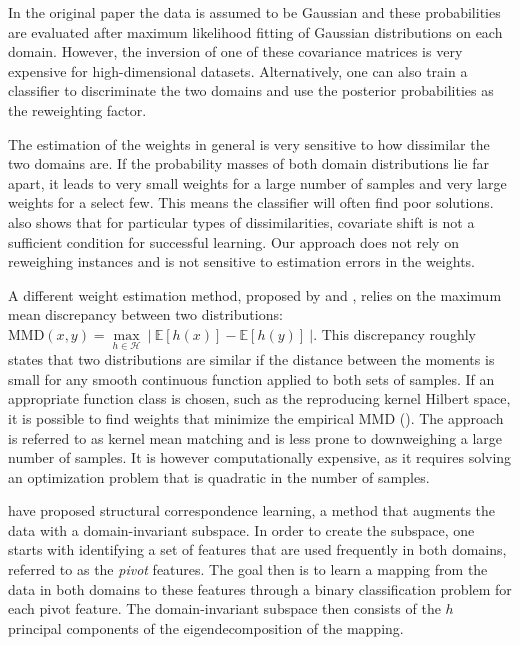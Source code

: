 \documentclass[twoside,11pt]{article}
\begin{document}
In the original paper the data is assumed to be Gaussian and these probabilities are evaluated after maximum likelihood fitting of Gaussian distributions on each domain. However, the inversion of one of these covariance matrices is very expensive for high-dimensional datasets. Alternatively, one can also train a classifier to discriminate the two domains and use the posterior probabilities as the reweighting factor. 

The estimation of the weights in general is very sensitive to how dissimilar the two domains are. If the probability masses of both domain distributions lie far apart, it leads to very small weights for a large number of samples and very large weights for a select few. This means the classifier will often find poor solutions. \cite{ben2010impossibility} also shows that for particular types of dissimilarities, covariate shift is not a sufficient condition for successful learning. Our approach does not rely on reweighing instances and is not sensitive to estimation errors in the weights.

A different weight estimation method, proposed by \cite{huang2007correcting} and \cite{gretton2009covariate}, relies on the maximum mean discrepancy between two distributions: $\text{MMD}(x,y) = \underset{h \in \mathcal{H}}{\max} \ | \ \mathbb{E}[h(x)] - \mathbb{E}[h(y)] \ |$. This discrepancy roughly states that two distributions are similar if the distance between the moments is small for any smooth continuous function applied to both sets of samples. If an appropriate function class is chosen, such as the reproducing kernel Hilbert space, it is possible to find weights that minimize the empirical MMD (\citealp{borgwardt2006integrating}). The approach is referred to as kernel mean matching and is less prone to downweighing a large number of samples. It is however computationally expensive, as it requires solving an optimization problem that is quadratic in the number of samples. 

\cite{blitzer2006domain} have proposed structural correspondence learning, a method that augments the data with a domain-invariant subspace. In order to create the subspace, one starts with identifying a set of features that are used frequently in both domains, referred to as the \emph{pivot} features. The goal then is to learn a mapping from the data in both domains to these features through a binary classification problem for each pivot feature. The domain-invariant subspace then consists of the $h$ principal components of the eigendecomposition of the mapping.
\end{document}
